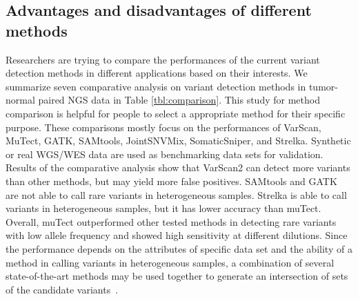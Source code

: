 \documentclass[a4,center,fleqn]{NAR}
\begin{document}
\subsection{Advantages and disadvantages of different methods}

Researchers are trying to compare the performances of the current variant detection methods in different applications based on their interests.
We summarize seven comparative analysis on variant detection methods in tumor-normal paired NGS data in Table \ref{tbl:comparison}.
This study for method comparison is helpful for people to select a appropriate method for their specific purpose.
These comparisons mostly focus on the performances of VarScan, MuTect, GATK, SAMtools, JointSNVMix, SomaticSniper, and Strelka.
Synthetic or real WGS/WES data are used as benchmarking data sets for validation.
Results of the comparative analysis show that VarScan2 can detect more variants than other methods, but may yield more false positives.
SAMtools and GATK are not able to call rare variants in heterogeneous samples.
Strelka is able to call variants in heterogeneous samples, but it has lower accuracy than muTect.
Overall, muTect outperformed other tested methods in detecting rare variants with low allele frequency and showed high sensitivity at different dilutions.
Since the performance depends on the attributes of specific data set and the ability of a method in calling variants in heterogeneous samples, a combination of several state-of-the-art methods may be used together to generate an intersection of sets of the candidate variants~\citep{liu2013variant}.
\end{document}
